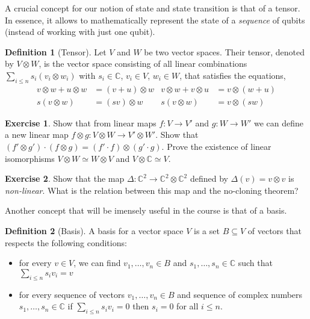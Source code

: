 \documentclass[a4paper, 11pt]{article}
\newcommand{\complex}{\mathbb{C}}
\theoremstyle{definition}
\newtheorem{definition}{Definition}
\newtheorem{exercise}{Exercise}
\begin{document}
A crucial concept for our notion of state and state transition is that
of a tensor. In essence, it allows to mathematically represent the
state of a \emph{sequence} of qubits (instead of working with just one
qubit).

\begin{definition}[Tensor]
  Let $V$ and $W$ be two vector spaces. Their tensor, denoted by
  $V \otimes W$, is the vector space consisting of all linear
  combinations $\sum_{i \leq n} s_i  (v_i \otimes w_i)$ with
  $s_i \in \complex$, $v_i \in V$, $w_i \in W$, that satisfies the equations,
  \begin{align*}
   v \otimes w + u \otimes w & = (v + u) \otimes w &
   v \otimes w + v \otimes u & = v \otimes (w + u) \\
   s  (v \otimes w) & = (s v) \otimes w &
   s  (v \otimes w) & = v \otimes (s w)
  \end{align*}
\end{definition}

\begin{exercise}
  Show that from linear maps $f : V \to V'$ and $g : W \to W'$ we can
  define a new linear map
  $f \otimes g : V \otimes W \to V' \otimes W'$. Show that
  $(f' \otimes g') \cdot (f \otimes g)  = (f' \cdot f ) \otimes (g'
  \cdot g)$. Prove the existence of linear isomorphisms
  $V \otimes W \simeq W \otimes V$ and $V \otimes \complex \simeq V$.
\end{exercise}

\begin{exercise}
  Show that the map
  $\Delta : \complex^2 \to \complex^2 \otimes \complex^2$ defined by
  $\Delta(v) = v \otimes v$ is \emph{non-linear}. What is the relation
  between this map and the no-cloning theorem?
\end{exercise}

Another concept that will be imensely useful in the course is that of
a basis.

\begin{definition}[Basis]
  A basis for a vector space $V$ is a set $B \subseteq V$ of vectors that
  respects the following conditions:
  \begin{itemize}
  \item for every $v \in V$, we can find $v_1,\dots,v_n \in B$ and
    $s_1,\dots,s_n \in \complex$ such that
    $\sum_{i \leq n} s_i v_i = v$
  \item for every sequence of vectors $v_1,\dots,v_n \in B$ and
    sequence of complex numbers $s_1,\dots,s_n \in \complex$ if
    $\sum_{i \leq n} s_i  v_i = 0$ then $s_i = 0$ for all
    $i \leq n$.
  \end{itemize}
\end{definition}
\end{document}
